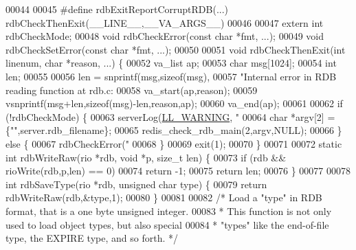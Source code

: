 \begin{DoxyCode}
00044 
00045 \textcolor{preprocessor}{#}\textcolor{preprocessor}{define} \textcolor{preprocessor}{rdbExitReportCorruptRDB}\textcolor{preprocessor}{(}\textcolor{preprocessor}{...}\textcolor{preprocessor}{)} \textcolor{preprocessor}{rdbCheckThenExit}\textcolor{preprocessor}{(}\textcolor{preprocessor}{\_\_LINE\_\_}\textcolor{preprocessor}{,}\textcolor{preprocessor}{\_\_VA\_ARGS\_\_}\textcolor{preprocessor}{)}
00046 
00047 \textcolor{keyword}{extern} \textcolor{keywordtype}{int} rdbCheckMode;
00048 \textcolor{keywordtype}{void} rdbCheckError(\textcolor{keyword}{const} \textcolor{keywordtype}{char} *fmt, ...);
00049 \textcolor{keywordtype}{void} rdbCheckSetError(\textcolor{keyword}{const} \textcolor{keywordtype}{char} *fmt, ...);
00050 
00051 \textcolor{keywordtype}{void} rdbCheckThenExit(\textcolor{keywordtype}{int} linenum, \textcolor{keywordtype}{char} *reason, ...) \{
00052     va\_list ap;
00053     \textcolor{keywordtype}{char} msg[1024];
00054     \textcolor{keywordtype}{int} len;
00055 
00056     len = snprintf(msg,\textcolor{keyword}{sizeof}(msg),
00057         \textcolor{stringliteral}{"Internal error in RDB reading function at rdb.c:%
00058     va\_start(ap,reason);
00059     vsnprintf(msg+len,\textcolor{keyword}{sizeof}(msg)-len,reason,ap);
00060     va\_end(ap);
00061 
00062     \textcolor{keywordflow}{if} (!rdbCheckMode) \{
00063         serverLog(\hyperlink{server_8h_a31229b9334bba7d6be2a72970967a14b}{LL\_WARNING}, \textcolor{stringliteral}{"%
00064         \textcolor{keywordtype}{char} *argv[2] = \{\textcolor{stringliteral}{""},server.rdb\_filename\};
00065         redis\_check\_rdb\_main(2,argv,NULL);
00066     \} \textcolor{keywordflow}{else} \{
00067         rdbCheckError(\textcolor{stringliteral}{"%
00068     \}
00069     exit(1);
00070 \}
00071 
00072 \textcolor{keyword}{static} \textcolor{keywordtype}{int} rdbWriteRaw(rio *rdb, \textcolor{keywordtype}{void} *p, size\_t len) \{
00073     \textcolor{keywordflow}{if} (rdb && rioWrite(rdb,p,len) == 0)
00074         \textcolor{keywordflow}{return} -1;
00075     \textcolor{keywordflow}{return} len;
00076 \}
00077 
00078 \textcolor{keywordtype}{int} rdbSaveType(rio *rdb, \textcolor{keywordtype}{unsigned} \textcolor{keywordtype}{char} type) \{
00079     \textcolor{keywordflow}{return} rdbWriteRaw(rdb,&type,1);
00080 \}
00081 
00082 \textcolor{comment}{/* Load a "type" in RDB format, that is a one byte unsigned integer.}
00083 \textcolor{comment}{ * This function is not only used to load object types, but also special}
00084 \textcolor{comment}{ * "types" like the end-of-file type, the EXPIRE type, and so forth. */}
}}}
\end{DoxyCode}
